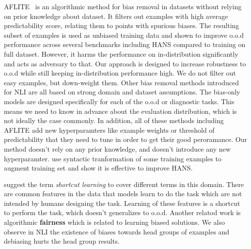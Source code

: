 AFLITE~\citep{bras2020adversarial} is an algorithmic method for bias removal in datasets without relying on prior knowledge about dataset. It filters out examples with high average predictability score, relating them to points with spurious biases. The resulting subset of 
examples is used as unbiased training data and shown to improve o.o.d performance across several benchmarks including HANS compared to training on full dataset. 
However, it harms the performance on in-distribution significantly and
acts as adversary to that. 
Our approach is designed to increase robustness to o.o.d while still keeping
in-distribution performance high. We do not filter out easy examples,
but down-weight them.
Other bias removal methods introduced for NLI are all based on strong 
domain and dataset assumptions. The bias-only models are 
designed specifically for each of the o.o.d or diagnostic tasks.
This means we need to know in advance about the evaluation distribution,
which is not ideally the case commonly.
In addition, all of these methods including AFLITE add new hyperparamters
like example weights or threshold of predictability 
that they need to tune in order to get their good peroramance.
Our method doesn't rely on any prior knowledge, and doesn't introduce any
new hyperparamter. 
 use syntactic tranformation of some training examples to augment training set and show it is 
effective to improve HANS.


\newcite{} suggest the term \emph{shortcut learning} to cover different 
terms in this domain. 
There are common features in the data that models learn to do the task which are not intended by humans designing the task.
Learning of these features is a shortcut to perform the task, which
doesn't generalizes to o.o.d.
Another relatod work is algorithmic \textbf{fairness}
which is related to learning biased solutions. 
We also observe in NLI  the existence of biases 
towards head groups of examples and debiasing hurts the head group results. 





